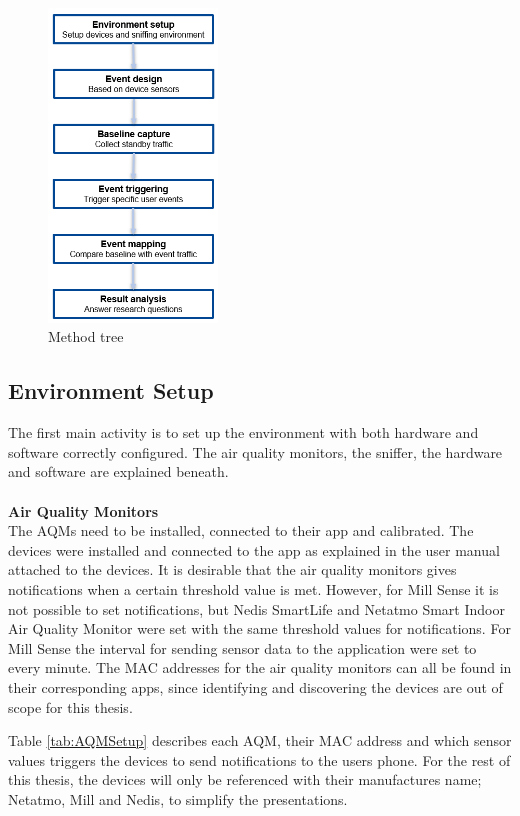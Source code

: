 \begin{figure} [H]
    \centering
    \includegraphics[width=0.4\textwidth]{figures/MethodTree.png}
    \caption{Method tree}
    \label{fig:MethodTree}
\end{figure}
\subsection{Environment Setup}
The first main activity is to set up the environment with both hardware and software correctly configured. The air quality monitors, the sniffer, the hardware and software are explained beneath. 
\\\\
\textbf{Air Quality Monitors}\\
The \gls{AQM}s need to be installed, connected to their app and calibrated. The devices were installed and connected to the app as explained in the user manual attached to the devices. It is desirable that the air quality monitors gives notifications when a certain threshold value is met. However, for Mill Sense it is not possible to set notifications, but Nedis SmartLife and Netatmo Smart Indoor Air Quality Monitor were set with the same threshold values for notifications. For Mill Sense the interval for sending sensor data to the application were set to every minute. The \gls{MAC} addresses for the air quality monitors can all be found in their corresponding apps, since identifying and discovering the devices are out of scope for this thesis. 

Table \ref{tab:AQMSetup} describes each \gls{AQM}, their \gls{MAC} address and which sensor values triggers the devices to send notifications to the users phone. For the rest of this thesis, the devices will only be referenced with their manufactures name; Netatmo, Mill and Nedis, to simplify the presentations. 
 
